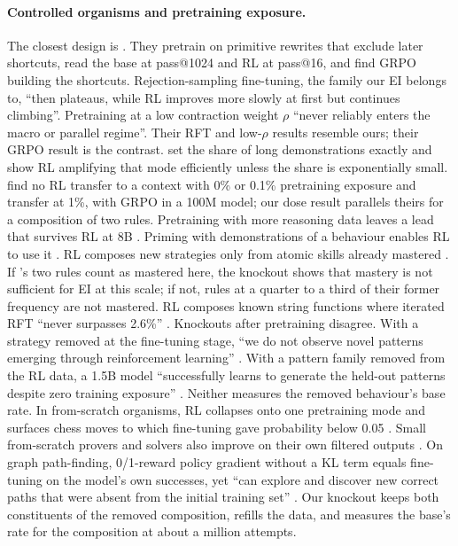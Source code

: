 \paragraph{Controlled organisms and pretraining exposure.} The closest design is \citet{abdulsalam2026rewrite}. They
pretrain on primitive rewrites that exclude later shortcuts, read the base at pass@1024 and RL at pass@16, and find GRPO
building the shortcuts. Rejection-sampling fine-tuning, the family our EI belongs to, ``then plateaus, while RL improves
more slowly at first but continues climbing''. Pretraining at a low contraction weight $\rho$ ``never
reliably enters the macro or parallel regime''. Their RFT and low-$\rho$ results resemble ours; their GRPO result is
the contrast. \citet{tsilivis2025rlntp} set the share of long demonstrations exactly and show RL amplifying that mode
efficiently unless the share is exponentially small. \citet{zhang2025interplay} find no RL transfer to a context with
0\% or 0.1\% pretraining exposure and transfer at 1\%, with GRPO in a 100M model; our dose result parallels theirs for
a composition of two rules. Pretraining with more reasoning data leaves a lead that survives RL at 8B \citep{akter2025frontloading}.
Priming with demonstrations of a behaviour enables RL to use it \citep{gandhi2025cognitive}. RL composes new strategies
only from atomic skills already mastered \citep{cheng2025atomicskills}. If \sig{}'s two rules count as mastered here,
the knockout shows that mastery is not sufficient for EI at this scale; if not, rules at a quarter to a third of their
former frequency are not mastered. RL composes known string functions where iterated RFT ``never surpasses 2.6\%''
\citep{yuan2025fgx}. Knockouts after pretraining disagree. With a strategy removed at the fine-tuning stage, ``we do not
observe novel patterns emerging through reinforcement learning'' \citep{krishnamurthy2026select}. With a pattern family
removed from the RL data, a 1.5B model ``successfully learns to generate the held-out patterns despite zero training
exposure'' \citep{park2025countdown}. Neither measures the removed behaviour's base rate. In from-scratch organisms, RL collapses onto one pretraining
mode \citep{zhao2025echochamber} and surfaces chess moves to which fine-tuning gave probability below 0.05
\citep{shen2026chess}. Small from-scratch provers and solvers also improve on their own filtered outputs
\citep{poesia2024minimo,lee2025selfimproving}. On graph path-finding, 0/1-reward policy gradient without a KL term
equals fine-tuning on the model's own successes, yet ``can explore and discover new correct paths that were absent from
the initial training set'' \citep{wang2025rlplanning}. Our knockout keeps both constituents of the removed composition, refills
the data, and measures the base's rate for the composition at about a million attempts.

